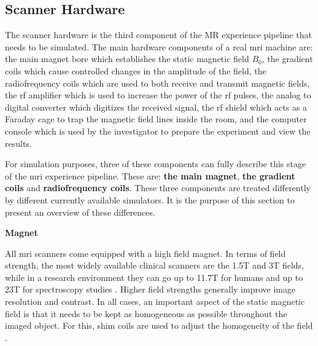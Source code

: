 \hfill

\subsection{Scanner Hardware}

The scanner hardware is the third component of the MR experience pipeline that needs to be simulated.
The main hardware components of a real \ac{mri} machine are: 
the main magnet bore which establishes the static magnetic field $B_0$, 
the gradient coils which cause controlled changes in the amplitude of the field,
the radiofrequency coils which are used to both receive and transmit magnetic fields,
the \ac{rf} amplifier which is used to increase the power of the \ac{rf} pulses,
the analog to digital converter which digitizes the received signal,
the \ac{rf} shield which acts as a Faraday cage to trap the magnetic field lines inside the room, and
the computer console which is used by the investigator to prepare the experiment and view the results.

\hfill

For simulation purposes, three of these components can fully describe this stage of the \ac{mri} experience pipeline.
These are: \textbf{the main magnet}, \textbf{the gradient coils} and \textbf{radiofrequency coils}.
These three components are treated differently by different currently available simulators.
It is the purpose of this section to present an overview of these differences.

\hfill

\large \textbf{Magnet} \normalsize

All \ac{mri} scanners come equipped with a high field magnet.
In terms of field strength, the most widely available clinical scanners are the 1.5T and 3T fields, while in a research environment they can go up to 11.7T for humans and up to 23T for spectroscopy studies \cite{Morrow2000}.
Higher field strengths generally improve image resolution and contrast.
In all cases, an important aspect of the static magnetic field is that it needs to be kept as homogeneous as possible throughout the imaged object.
For this, shim coils are used to adjust the homogeneity of the field \cite{Romeo1984}.

\hfill

